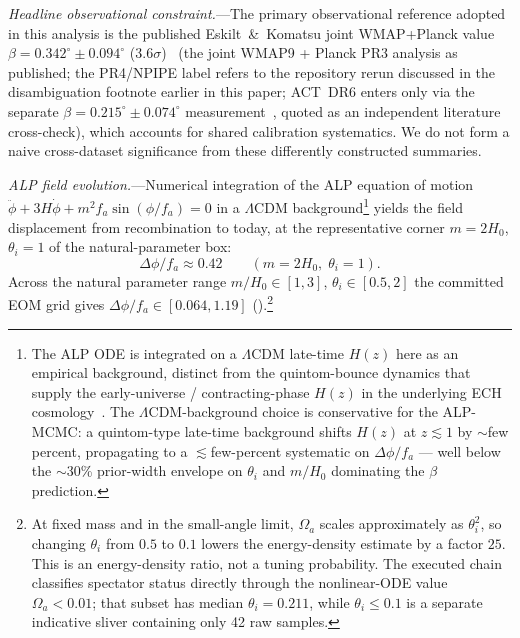 \documentclass[aps,prd,twocolumn,superscriptaddress,showpacs,preprintnumbers,nofootinbib,longbibliography,floatfix]{revtex4-2}
\begin{document}
\textit{Headline observational constraint.}---The primary observational reference
adopted in this analysis is the published Eskilt~\&~Komatsu joint WMAP+Planck value
$\beta = 0.342^\circ\pm 0.094^\circ$ ($3.6\sigma$)~\cite{Eskilt2022} (the
joint WMAP9 + Planck PR3 analysis as published; the PR4/NPIPE label refers
to the repository rerun discussed in the disambiguation footnote earlier in
this paper; ACT~DR6 enters only via the separate
$\beta=0.215^\circ\pm 0.074^\circ$ measurement~\cite{DiegoPalazuelos2025}, quoted
as an independent literature cross-check), which accounts for shared
calibration systematics. We do not form a naive cross-dataset significance
from these differently constructed summaries.

\textit{ALP field evolution.}---Numerical integration of the ALP equation of
motion $\ddot\phi + 3H\dot\phi + m^2 f_a\sin(\phi/f_a) = 0$ in a $\Lambda$CDM
background\footnote{The ALP ODE is integrated on a $\Lambda$CDM late-time
$H(z)$ here as an empirical background, distinct from the quintom-bounce
dynamics that supply the early-universe / contracting-phase $H(z)$ in the
underlying ECH cosmology~\cite{Cai2010quintomReview}. The $\Lambda$CDM-background
choice is conservative for the ALP-MCMC: a quintom-type late-time
background shifts $H(z)$ at
$z\!\lesssim\!1$ by $\sim$few percent, propagating to a $\lesssim$few-percent
systematic on $\Delta\phi/f_a$ — well below the $\sim$30\% prior-width
envelope on $\theta_i$ and $m/H_0$ dominating the $\beta$ prediction.}
yields the field displacement from recombination to today, at the
representative corner $m = 2H_0$, $\theta_i = 1$ of the natural-parameter box:
\begin{equation}
\Delta\phi/f_a \approx 0.42 \qquad (m = 2H_0,\; \theta_i = 1).
\end{equation}
Across the natural parameter range $m/H_0\in[1,3]$, $\theta_i\in[0.5,2]$
the committed EOM grid gives
$\Delta\phi/f_a \in [0.064, 1.19]$
().\footnote{\label{fn:theta_backreaction}At fixed
mass and in the small-angle limit, $\Omega_a$ scales approximately as
$\theta_i^2$, so changing $\theta_i$ from $0.5$ to $0.1$ lowers the
energy-density estimate by a factor $25$. This is an energy-density ratio,
not a tuning probability. The executed chain classifies spectator status
directly through the nonlinear-ODE value $\Omega_a<0.01$; that subset has
median $\theta_i=0.211$, while $\theta_i\le0.1$ is a separate indicative
sliver containing only 42 raw samples.}
\end{document}
